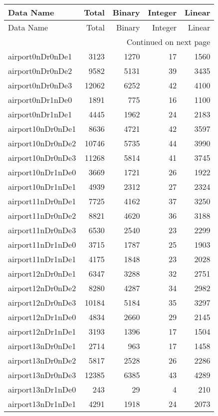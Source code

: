 \documentclass[../../../thesis.tex]{subfiles}
\begin{document}
\tiny
\begin{longtable}{lrrrr}
\toprule
Data Name & Total & Binary & Integer & Linear \\
\midrule
\endfirsthead
\toprule
Data Name & Total & Binary & Integer & Linear \\
\midrule
\endhead
\midrule
\multicolumn{5}{r}{Continued on next page} \\
\midrule
\endfoot
\bottomrule
\endlastfoot
airport0nDr0nDe1 & 3123 & 1270 & 17 & 1560 \\
airport0nDr0nDe2 & 9582 & 5131 & 39 & 3435 \\
airport0nDr0nDe3 & 12062 & 6252 & 42 & 4100 \\
airport0nDr1nDe0 & 1891 & 775 & 16 & 1100 \\
airport0nDr1nDe1 & 4445 & 1962 & 24 & 2183 \\
airport10nDr0nDe1 & 8636 & 4721 & 42 & 3597 \\
airport10nDr0nDe2 & 10746 & 5735 & 44 & 3990 \\
airport10nDr0nDe3 & 11268 & 5814 & 41 & 3745 \\
airport10nDr1nDe0 & 3669 & 1721 & 26 & 1922 \\
airport10nDr1nDe1 & 4939 & 2312 & 27 & 2324 \\
airport11nDr0nDe1 & 7725 & 4162 & 37 & 3250 \\
airport11nDr0nDe2 & 8821 & 4620 & 36 & 3188 \\
airport11nDr0nDe3 & 6530 & 2540 & 23 & 2299 \\
airport11nDr1nDe0 & 3715 & 1787 & 25 & 1903 \\
airport11nDr1nDe1 & 4175 & 1848 & 23 & 2028 \\
airport12nDr0nDe1 & 6347 & 3288 & 32 & 2751 \\
airport12nDr0nDe2 & 8280 & 4287 & 34 & 2982 \\
airport12nDr0nDe3 & 10184 & 5184 & 35 & 3297 \\
airport12nDr1nDe0 & 4834 & 2660 & 29 & 2145 \\
airport12nDr1nDe1 & 3193 & 1396 & 17 & 1504 \\
airport13nDr0nDe1 & 2714 & 963 & 17 & 1458 \\
airport13nDr0nDe2 & 5817 & 2528 & 26 & 2286 \\
airport13nDr0nDe3 & 12385 & 6385 & 43 & 4289 \\
airport13nDr1nDe0 & 243 & 29 & 4 & 210 \\
airport13nDr1nDe1 & 4291 & 1918 & 24 & 2073 \\

\end{longtable}
\end{document}
